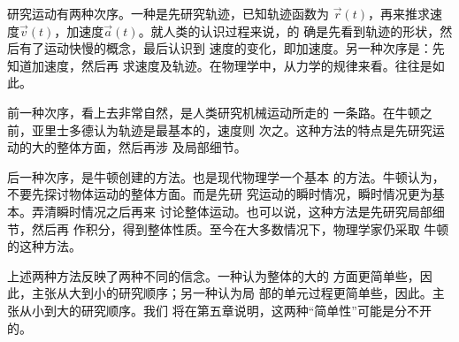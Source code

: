     研究运动有两种次序。一种是先研究轨迹，已知轨迹函数为
$\vec{r}(t)$，再来推求速度$\vec{v}(t)$，加速度$\vec{a}(t)$。就人类的认识过程来说，的
确是先看到轨迹的形状，然后有了运动快慢的概念，最后认识到
速度的变化，即加速度。另一种次序是：先知道加速度，然后再
求速度及轨迹。在物理学中，从力学的规律来看。往往是如此。

    前一种次序，看上去非常自然，是人类研究机械运动所走的
一条路。在牛顿之前，亚里士多德认为轨迹是最基本的，速度则
次之。这种方法的特点是先研究运动的大的整体方面，然后再涉
及局部细节。

    后一种次序，是牛顿创建的方法。也是现代物理学一个基本
的方法。牛顿认为，不要先探讨物体运动的整体方面。而是先研
究运动的瞬时情况，瞬时情况更为基本。弄清瞬时情况之后再来
讨论整体运动。也可以说，这种方法是先研究局部细节，然后再
作积分，得到整体性质。至今在大多数情况下，物理学家仍采取
牛顿的这种方法。

    上述两种方法反映了两种不同的信念。一种认为整体的大的
方面更简单些，因此，主张从大到小的研究顺序；另一种认为局
部的单元过程更简单些，因此。主张从小到大的研究顺序。我们
将在第五章说明，这两种“简单性”可能是分不开的。